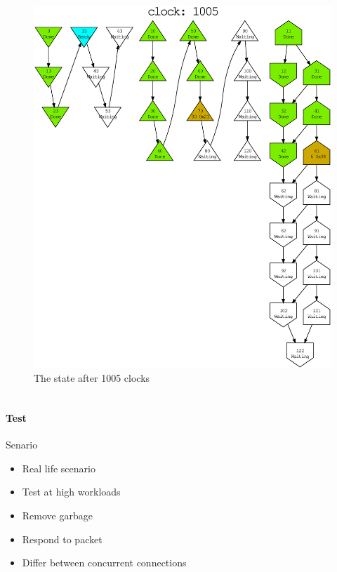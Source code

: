 \begin{frame}[fragile]
\begin{columns}
\begin{column}{0.50\textwidth}
\begin{figure}
                \includegraphics[scale=0.21]{evaluation/dot_files/example_graph_running_compact.eps}
                \caption{The state after 1005 clocks}
            \end{figure}
        \end{column}
    \end{columns}
\end{frame}

\begin{frame}%
    \frametitle{\EvaluationTitle}
    \framesubtitle{Test}
    Senario
    \begin{itemize}%
        \item Real life scenario
        \item Test at high workloads
        \item Remove garbage
        \item Respond to packet
        \item Differ between concurrent connections
    \end{itemize}
\end{frame}

